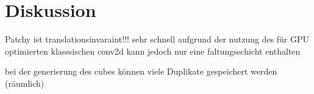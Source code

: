 \section{Diskussion}
\label{diskussion}

Patchy ist translationsinvaraint!!! sehr schnell aufgrund der nutzung des für GPU optimierten klasssischen conv2d
kann jedoch nur eine faltungsschicht enthalten

bei der generierung des cubes können viele Duplikate gespeichert werden (räumlich)
